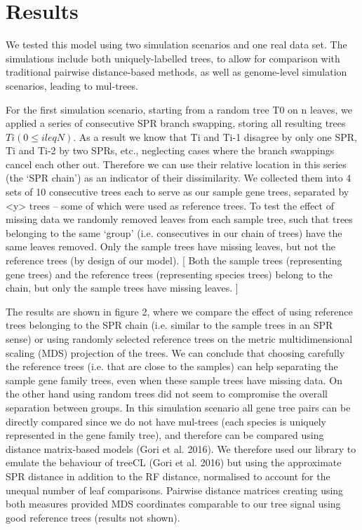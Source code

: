 \section{Results}
We tested this model using two simulation scenarios and one real data set. The simulations include both
uniquely-labelled trees, to allow for comparison with traditional pairwise distance-based methods, as well as
genome-level simulation scenarios, leading to mul-trees.

For the first simulation scenario, starting from a random tree T0 on n leaves, we applied a series of consecutive SPR
branch swapping, storing all resulting trees  ${Ti} (0 \leq i leq N)$.  
As a result we know that Ti  and Ti-1 disagree by only
one SPR, Ti  and Ti-2 by two SPRs, etc., neglecting cases where the branch swappings cancel each other out. Therefore we
can use their relative location in this series (the ‘SPR chain’) as an indicator of their dissimilarity. We collected
them into 4 sets of 10 consecutive trees each to serve as our sample gene trees, separated by <y> trees – some of which
were used as reference trees. To test the effect of missing data we randomly removed leaves from each sample tree, such
that trees belonging to the same ‘group’ (i.e. consecutives in our chain of trees) have the same leaves removed. Only
the sample trees have missing leaves, but not the reference trees (by design of our model). [ Both the sample trees
(representing gene trees) and the reference trees (representing species trees) belong to the chain, but only the sample
trees have missing leaves. ]

The results are shown in figure 2, where we compare the effect of using reference trees belonging to the SPR chain (i.e.
similar to the sample trees in an SPR sense) or using randomly selected reference trees on the metric multidimensional
scaling (MDS) projection of the trees. We can conclude that choosing carefully the reference trees (i.e. that are close
to the samples) can help separating the sample gene family trees, even when these sample trees have missing data. On the
other hand using random trees did not seem to compromise the overall separation between groups. In this simulation
scenario all gene tree pairs can be directly compared since we do not have mul-trees (each species is uniquely
represented in the gene family tree), and therefore can be compared using distance matrix-based models (Gori et al.
2016). We therefore used our library to emulate the behaviour of treeCL (Gori et al. 2016) but using the approximate SPR
distance in addition to the RF distance, normalised to account for the unequal number of leaf comparisons. Pairwise
distance matrices creating using both measures provided MDS coordinates comparable to our tree signal using good
reference trees (results not shown). 


